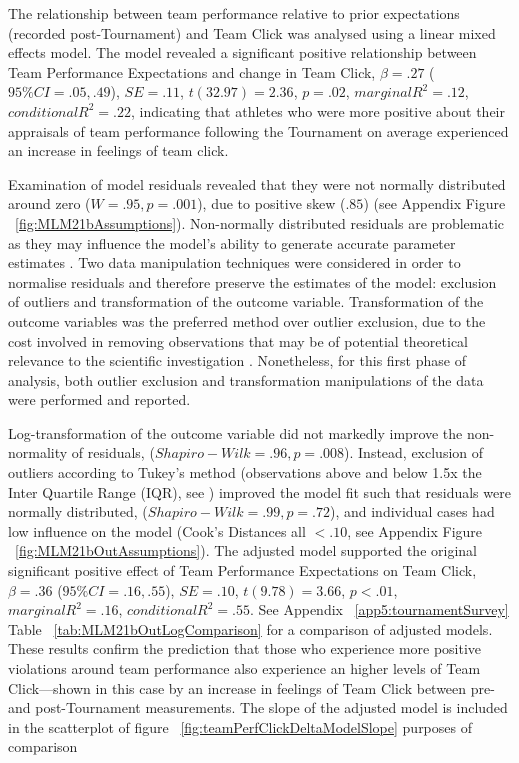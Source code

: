The relationship between team performance relative to prior expectations (recorded post-Tournament) and Team Click was analysed using a linear mixed effects model. The model revealed a significant positive relationship between Team Performance Expectations and change in Team Click,  $\beta = .27$ ($95\% CI =  .05, .49$), $SE = .11$, $t(32.97) = 2.36$, $p = .02$, $marginal R^2 = .12$, $conditional R^2 = .22$, indicating that athletes who were more positive about their appraisals of team performance following the Tournament on average experienced an increase in feelings of team click.

Examination of model residuals revealed that they were not normally distributed around zero ($W = .95, p = .001$), due to positive skew ($.85$) (see Appendix Figure ~\ref{fig:MLM21bAssumptions}).  Non-normally distributed residuals are problematic as they may influence the model's ability to generate accurate parameter estimates . Two data manipulation techniques were considered in order to normalise residuals and therefore preserve the estimates of the model: exclusion of outliers and transformation of the outcome variable.  Transformation of the outcome variables was the preferred method over outlier exclusion, due to the cost involved in removing observations that may be of potential theoretical relevance to the scientific investigation \citep{Rousseeuw2011}. Nonetheless, for this first phase of analysis, both outlier exclusion and transformation manipulations of the data were performed and reported.

Log-transformation of the outcome variable did not markedly improve the non-normality of residuals, ($Shapiro-Wilk = .96, p = .008$).  Instead, exclusion of outliers according to Tukey's method (observations above and below 1.5x the Inter Quartile Range (IQR), see \citep{Tukey1977}) improved the model fit such that residuals were normally distributed, ($Shapiro-Wilk = .99, p = .72$), and individual cases had low influence on the model (Cook's Distances all $< .10$, see Appendix Figure ~\ref{fig:MLM21bOutAssumptions}).
The adjusted model supported the original significant positive effect of Team Performance Expectations on Team Click, $\beta = .36$ ($95\% CI =  .16, .55$), $SE = .10$, $t(9.78) = 3.66$, $p < .01$, $marginal R^2 = .16$, $conditional R^2 = .55$.
See Appendix ~\ref{app5:tournamentSurvey} Table ~\ref{tab:MLM21bOutLogComparison} for a comparison of adjusted models. These results confirm the prediction that those who experience more positive violations around team performance also experience an higher levels of Team Click---shown in this case by an increase in feelings of Team Click between pre- and post-Tournament measurements.  The slope of the adjusted model is included in the scatterplot of figure ~\ref{fig:teamPerfClickDeltaModelSlope} purposes of comparison

